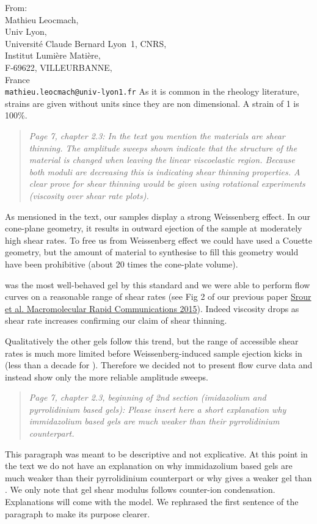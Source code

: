\documentclass[a4paper, parskip=true, firsthead=false, fromemail=true, foldmarks=false]{scrlttr2}
\newenvironment{quotationi}
{\begin{quotation}\itshape}
{\end{quotation}}
\begin{document}
\begin{letter}{From:\\
Mathieu Leocmach,\\
Univ Lyon,\\ 
Universit\'e Claude Bernard Lyon~1, CNRS,\\
Institut Lumi\`ere Mati\`ere,\\
F-69622, VILLEURBANNE,\\
France\\
\texttt{mathieu.leocmach@univ-lyon1.fr}
}
As it is common in the rheology literature, strains are given without units since they are non dimensional. A strain of 1 is 100\%.

\begin{quotationi}
Page 7, chapter 2.3: In the text you mention the materials are shear thinning. The amplitude sweeps shown indicate that the structure of the material is changed when leaving the linear viscoelastic region. Because both moduli are decreasing this is indicating shear thinning properties. A clear prove for shear thinning would be given using rotational experiments (viscosity over shear rate plots).
\end{quotationi}

As mensioned in the text, our samples display a strong Weissenberg effect. In our cone-plane geometry, it results in outward ejection of the sample at moderately high shear rates. To free us from Weissenberg effect we could have used a Couette geometry, but the amount of material to synthesise to fill this geometry would have been prohibitive (about 20 times the cone-plate volume).

 was the most well-behaved gel by this standard and we were able to perform flow curves on a reasonable range of shear rates (see Fig 2 of our previous paper \href{http://doi.org/10.1002/marc.201400478}{Srour et al. Macromolecular Rapid Communications 2015}). Indeed viscosity drops as shear rate increases confirming our claim of shear thinning.

Qualitatively the other gels follow this trend, but the range of accessible shear rates is much more limited before Weissenberg-induced sample ejection kicks in (less than a decade for ). Therefore we decided not to present flow curve data and instead show only the more reliable amplitude sweeps.



\begin{quotationi}
Page 7, chapter 2.3, beginning of 2nd section (imidazolium and pyrrolidinium based gels): Please insert here a short explanation why immidazolium based gels are much weaker than their pyrrolidinium counterpart.
\end{quotationi}

This paragraph was meant to be descriptive and not explicative. At this point in the text we do not have an explanation on why immidazolium based gels are much weaker than their pyrrolidinium counterpart or why  gives a weaker gel than . We only note that gel shear modulus follows counter-ion condensation. Explanations will come with the model. We rephrased the first sentence of the paragraph to make its purpose clearer.


\end{letter}
\end{document}
